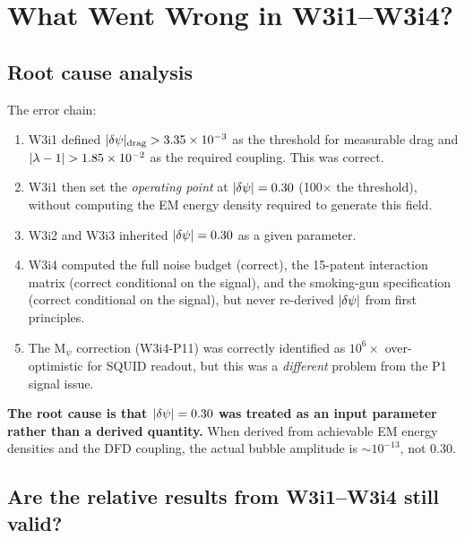 \section{What Went Wrong in W3i1--W3i4?}
\label{sec:postmortem}

\subsection{Root cause analysis}
\label{ssec:root_cause}

The error chain:
\begin{enumerate}[nosep]
\item W3i1 defined $|\delta\psi|_{\rm drag} > 3.35\times 10^{-3}$ as the threshold for
  measurable drag and $|\lambda - 1| > 1.85\times 10^{-2}$ as the required coupling. This
  was correct.
\item W3i1 then set the \emph{operating point} at $|\delta\psi| = 0.30$
  (100$\times$ the threshold), without computing the EM energy density
  required to generate this field.
\item W3i2 and W3i3 inherited $|\delta\psi| = 0.30$ as a given parameter.
\item W3i4 computed the full noise budget (correct), the 15-patent
  interaction matrix (correct conditional on the signal), and the
  smoking-gun specification (correct conditional on the signal), but
  never re-derived $|\delta\psi|$ from first principles.
\item The M$_\psi$ correction (W3i4-P11) was correctly identified as
  $10^6\times$ over-optimistic for SQUID readout, but this was a
  \emph{different} problem from the P1 signal issue.
\end{enumerate}

\textbf{The root cause is that $|\delta\psi| = 0.30$ was treated as an
input parameter rather than a derived quantity.} When derived from
achievable EM energy densities and the DFD coupling, the actual bubble
amplitude is $\sim 10^{-13}$, not $0.30$.

\subsection{Are the relative results from W3i1--W3i4 still valid?}
\label{ssec:relative_results}

